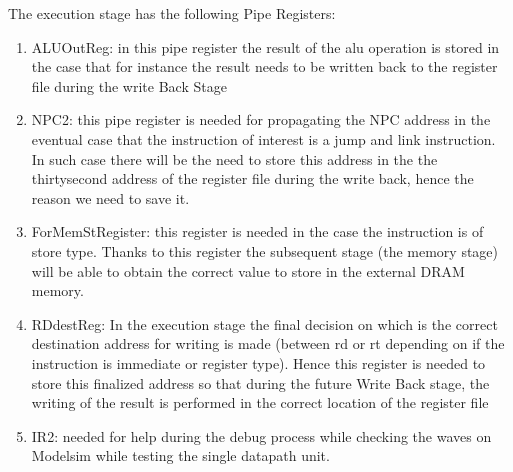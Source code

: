 The execution stage has the following Pipe Registers:
\begin{enumerate}
    \item ALUOutReg: in this pipe register the result of the alu operation is stored in the case that for instance the result needs to 
    be written back to the register file during the write Back Stage
    \item NPC2: this pipe register is needed for propagating the NPC address in the eventual case that the instruction of interest is
    a jump and link instruction. In such case there will be the need to store this address in the the thirtysecond address of the register 
    file during the write back, hence the reason we need to save it.
    \item ForMemStRegister: this register is needed in the case the instruction is of store type. Thanks to this register the subsequent stage (the memory stage) will
    be able to obtain the correct value to store in the external DRAM memory.
    \item RDdestReg: In the execution stage the final decision on which is the correct destination address for writing is made (between rd or rt depending on if the instruction is immediate or register type).
    Hence this register is needed to store this finalized address so that during the future Write Back stage, the writing of the result is performed in the correct location of the register file
    \item IR2: needed for help during the debug process while checking the waves on Modelsim while testing the single datapath unit.
\end{enumerate}
